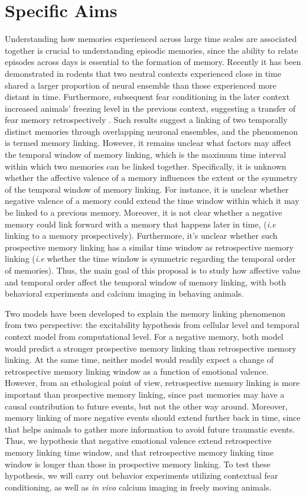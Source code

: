 \documentclass[master.tex]{subfiles}
\begin{document}
\section*{Specific Aims}

Understanding how memories experienced across large time scales are associated
together is crucial to understanding episodic memories, since the ability to
relate episodes across days is essential to the formation of memory. Recently it
has been demonstrated in rodents that two neutral contexts experienced close in
time shared a larger proportion of neural ensemble than those experienced more
distant in time. Furthermore, subsequent fear conditioning in the later context
increased animals' freezing level in the previous context, suggesting a transfer
of fear memory retrospectively \cite{cai_shared_2016}. Such results suggest a
linking of two temporally distinct memories through overlapping neuronal
ensembles, and the phenomenon is termed memory linking. However, it remains
unclear what factors may affect the temporal window of memory linking, which is
the maximum time interval within which two memories can be linked together.
Specifically, it is unknown whether the affective valence of a memory influences
the extent or the symmetry of the temporal window of memory linking. For
instance, it is unclear whether negative valence of a memory could extend the
time window within which it may be linked to a previous memory. Moreover, it is
not clear whether a negative memory could link forward with a memory that
happens later in time, (\textit{i.e} linking to a memory prospectively).
Furthermore, it's unclear whether such prospective memory linking has a similar
time window as retrospective memory linking (\textit{i.e} whether the time
window is symmetric regarding the temporal order of memories). Thus, the main
goal of this proposal is to study how affective value and temporal order affect
the temporal window of memory linking, with both behavioral experiments and
calcium imaging in behaving animals.

Two models have been developed to explain the memory linking phenomenon from two
perspective: the excitability hypothesis from cellular level and temporal
context model from computational level. For a negative memory, both model would
predict a stronger prospective memory linking than retrospective memory linking.
At the same time, neither model would readily expect a change of retrospective
memory linking window as a function of emotional valence. However, from an
ethological point of view, retrospective memory linking is more important than
prospective memory linking, since past memories may have a causal contribution
to future events, but not the other way around. Moreover, memory linking of more
negative events should extend further back in time, since that helps animals to
gather more information to avoid future traumatic events. Thus, we hypothesis
that negative emotional valence extend retrospective memory linking time window,
and that retrospective memory linking time window is longer than those in
prospective memory linking. To test these hypothesis, we will carry out behavior
experiments utilizing contextual fear conditioning, as well as \textit{in vivo}
calcium imaging in freely moving animals.
\end{document}
